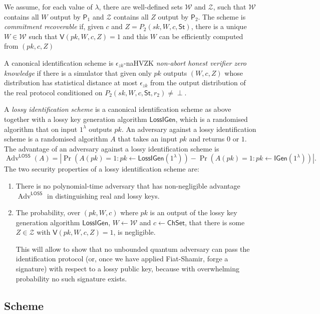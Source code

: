 \documentclass{llncs}
\DeclareMathOperator{\Adv}{Adv}
\newcommand{\IGen}{\mathsf{IGen}}
\newcommand{\PP}{\mathsf{P}}
\newcommand{\VV}{\mathsf{V}}
\newcommand{\Wset}{\mathcal{W}}
\newcommand{\Zset}{\mathcal{Z}}
\newcommand{\ChSet}{\textsf{ChSet}}
\newcommand{\St}{\textsf{St}}
\newcommand{\LossIGen}{\mathsf{LossIGen}}
\begin{document}
We assume, for each value of $\lambda$, there are well-defined sets $\Wset$ and $\Zset$, such that $\Wset$ contains all $W$ output by $\PP_1$ and $\Zset$ contains all $Z$ output by $\PP_2$. 
The scheme is \emph{commitment recoverable} if, given $c$ and $Z = P_2( sk, W, c, \St )$, there is a unique $W \in \Wset$ such that $\VV( pk, W, c, Z ) = 1$ and this $W$ can be efficiently computed from $(pk, c, Z)$

A canonical identification scheme is $\epsilon_{zk}$-naHVZK \emph{non-abort honest verifier zero knowledge} if there is a simulator that given only $pk$ outputs $(W, c, Z)$ whose distribution has statistical distance at most $\epsilon_{zk}$ from the output distribution of the real protocol conditioned on $P_2( sk, W, c, \St, r_2 ) \ne \perp$.


A \emph{lossy identification scheme} is a canonical identification scheme as above together with a lossy key generation algorithm $\LossIGen$, which is a randomised algorithm that on input $1^\lambda$ outputs $pk$.
An adversary against a lossy identification scheme is a randomised algorithm $A$ that takes an input $pk$ and returns $0$ or $1$.
The advantage of an adversary against a lossy identification scheme is 
\[
   \Adv^{\textsf{LOSS}}(A) = \left|
   \Pr\left( A( pk ) = 1 : pk \leftarrow \LossIGen(1^\lambda) \right) - \Pr\left( A( pk ) = 1 : pk \leftarrow \IGen( 1^\lambda ) \right) \right|.
\]
The two security properties of a lossy identification scheme are:
\begin{enumerate}
\item There is no polynomial-time adversary that has non-negligible advantage $\Adv^{\textsf{LOSS}}$ in distinguishing real and lossy keys.
\item The probability, over $(pk, W, c)$ where $pk$ is an output of the lossy key generation algorithm $\LossIGen$, $W \leftarrow \Wset$ and $c \leftarrow \ChSet$, that there is some $Z \in \Zset$ with $\VV( pk, W, c, Z ) = 1$, is negligible.

This will allow to show that no unbounded quantum adversary can pass the identification protocol (or, once we have applied Fiat-Shamir, forge a signature) with respect to a lossy public key, because with overwhelming probability no such signature exists.
\end{enumerate}


\subsection{Scheme}
\end{document}
